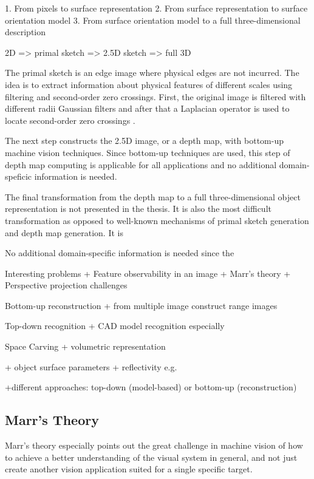 \documentclass[12pt,a4paper,oneside,pdftex]{report}
\begin{document}
{1. From pixels to surface representation
2. From surface representation to surface orientation model
3. From surface orientation model to a full three-dimensional description

2D => primal sketch => 2.5D sketch => full 3D

The primal sketch is an edge image where physical edges are not incurred. The idea is to extract information about physical features of different scales using filtering and second-order zero crossings. First, the original image is filtered with different radii Gaussian filters and after that a Laplacian operator is used to locate second-order zero crossings \cite{Sonka07}. 

The next step constructs the 2.5D image, or a depth map, with bottom-up machine vision techniques. Since bottom-up techniques are used, this step of depth map computing is applicable for all applications and no additional domain-speficic information is needed. 

The final transformation from the depth map to a full three-dimensional object representation is not presented in the thesis. It is also the most difficult transformation as opposed to well-known mechanisms of primal sketch generation and depth map generation. It is 


No additional domain-specific information is needed since the 

Interesting problems
+ Feature observability in an image
+ Marr's theory
+ Perspective projection challenges

Bottom-up reconstruction
    + from multiple image construct range images

Top-down recognition
    + CAD model recognition especially

Space Carving
    + volumetric representation


+ object surface parameters
    + reflectivity e.g.
    
    
+different approaches: top-down (model-based) or bottom-up (reconstruction)



\subsection{Marr's Theory}
\label{subsection:marrs_theory}

Marr's theory especially points out the great challenge in machine vision of how to achieve a better understanding of the visual system in general, and not just create another vision application suited for a single specific target.

}
\end{document}
